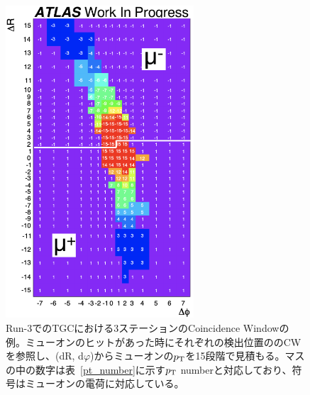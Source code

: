 
\begin{figure}[tb]
  \centering
  \includegraphics[clip, width=7cm]{fig/3/Run3CW.pdf}
  \caption{Run-3でのTGCにおける3ステーションのCoincidence Windowの例\cite{article:shiomi-mron}。ミューオンのヒットがあった時にそれぞれの検出位置ののCWを参照し、(dR, d$φ$)からミューオンの$p_{\rm{T}}$を15段階で見積もる。マスの中の数字は表~\ref{pt_number}に示す$p_{\rm{T}}$ numberと対応しており、符号はミューオンの電荷に対応している。}
  \label{fig:CW}
\end{figure}

